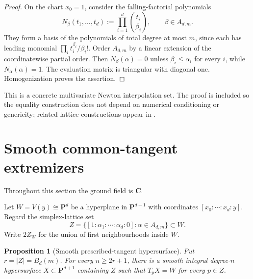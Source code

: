 \documentclass[11pt]{article}
\newtheorem{proposition}[theorem]{Proposition}
\newcommand{\PP}{\mathbf P}
\newcommand{\CC}{\mathbf C}
\newcommand{\BZ}{B_d(m)}
\begin{document}
\begin{proof}
On the chart $x_0=1$, consider the falling-factorial polynomials
\[
 N_\beta(t_1,\ldots,t_d):=\prod_{i=1}^d\binom{t_i}{\beta_i},
 \qquad \beta\in A_{d,m}.
\]
They form a basis of the polynomials of total degree at most $m$, since each
has leading monomial $\prod_i t_i^{\beta_i}/\beta_i!$.  Order $A_{d,m}$ by a
linear extension of the coordinatewise partial order.  Then
$N_\beta(\alpha)=0$ unless $\beta_i\leq\alpha_i$ for every $i$, while
$N_\alpha(\alpha)=1$.  The evaluation matrix is triangular with diagonal
one.  Homogenization proves the assertion.
\end{proof}

This is a concrete multivariate Newton interpolation set.  The proof is
included so the equality construction does not depend on numerical
conditioning or genericity; related lattice constructions appear in
\cite{ChungYao1977,LeePhillips1991}.

\section{Smooth common-tangent extremizers}\label{sec:extremizers}

Throughout this section the ground field is $\CC$.

Let $W=V(y)\cong\PP^d$ be a hyperplane in $\PP^{d+1}$ with coordinates
$[x_0:\cdots:x_d:y]$.  Regard the simplex-lattice set
\[
 Z=\{[1:\alpha_1:\cdots:\alpha_d:0]:\alpha\in A_{d,m}\}\subset W.
\]
Write $2Z_W$ for the union of first neighbourhoods inside $W$.

\begin{proposition}[Smooth prescribed-tangent hypersurface]
\label{prop:bertini}
Put $r=|Z|=\BZ$.  For every $n\geq2r+1$, there is a smooth integral
degree-$n$ hypersurface $X\subset\PP^{d+1}$ containing $Z$ such that
$T_pX=W$ for every $p\in Z$.
\end{proposition}
\end{document}
